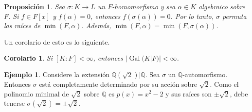 \documentclass{amsbook}
\renewcommand{\.}{\cdot}
\renewcommand{\:}{\colon}               %
\newcommand{\bQ}{\mathbb{Q}}    %
\DeclareMathOperator{\Gal}{Gal}
\newcommand{\al}{\alpha}                %
\newcommand{\sg}{\sigma}
\theoremstyle{plain}
\newtheorem{Prop}[Th]{Proposición}     %
\newtheorem{Cor}[Th]{Corolario}        %
\theoremstyle{definition}
\newtheorem{Ex}[Th]{Ejemplo}           %
\theoremstyle{remark}
\numberwithin{equation}{section}
\begin{document}
\begin{Prop}
    Sea $\sg\: K\to L$ un $F$-homomorfismo y sea $\al\in K$ algebraico sobre $F$. Si $f\in F[x]$ y $f(\al)=0$, entonces $f(\sg(\al))=0$. Por lo tanto, $\sg$ permuta las raíces de $\min(F,\al)$. Además, $\min(F,\al)=\min(F,\sg(\al))$.
\end{Prop}

Un corolario de esto es lo siguiente.

\begin{Cor}
    Si $[K:F]<\infty$, entonces $|\Gal(K|F)|<\infty$.
\end{Cor}

\begin{Ex}
    Considere la extensión $\bQ(\sqrt{2})|\bQ$. Sea $\sg$ un $\bQ$-automorfismo. Entonces $\sg$ está completamente determinado por su acción sobre $\sqrt{2}$. Como el polinomio minimal de $\sqrt{2}$ sobre $\bQ$ es $p(x)=x^2-2$ y sus raíces son $\pm\sqrt{2}$, debe tenerse $\sg(\sqrt{2})=\pm\sqrt{2}$.
\end{Ex}
%
%
\end{document}
